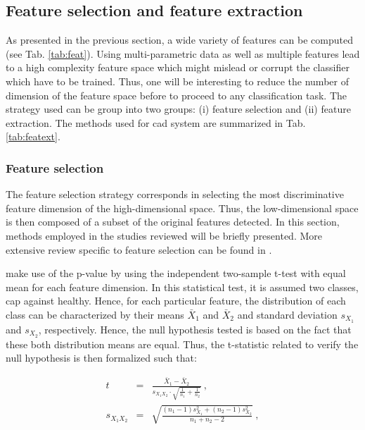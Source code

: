 \subsection{Feature selection and feature extraction} \label{subsec:featureselectionextraction}

As presented in the previous section, a wide variety of features can be computed (see Tab. \ref{tab:feat}). Using multi-parametric data as well as multiple features lead to a high complexity feature space which might mislead or corrupt the classifier which have to be trained. Thus, one will be interesting to reduce the number of dimension of the feature space before to proceed to any classification task. The strategy used can be group into two groups: (i) feature selection and (ii) feature extraction. The methods used for \ac{cad} system are summarized in Tab. \ref{tab:featext}.

\subsubsection{Feature selection}\label{subsubsec:featsel}

The feature selection strategy corresponds in selecting the most discriminative feature dimension of the high-dimensional space. Thus, the low-dimensional space is then composed of a subset of the original features detected. In this section, methods employed in the studies reviewed will be briefly presented. More extensive review specific to feature selection can be found in \cite{Saeys2007}.

\cite{Niaf2011,Niaf2012} make use of the p-value by using the independent two-sample t-test with equal mean for each feature dimension. In this statistical test, it is assumed two classes, \ac{cap} against healthy. Hence, for each particular feature, the distribution of each class can be characterized by their means $\bar{X}_1$ and $\bar{X}_2$ and standard deviation $s_{X_1}$ and $s_{X_2}$, respectively. Hence, the null hypothesis tested is based on the fact that these both distribution means are equal. Thus, the t-statistic related to verify the null hypothesis is then formalized such that:

\begin{eqnarray}
t & = & \frac{\bar {X}_1 - \bar{X}_2}{s_{X_1X_2} \cdot \sqrt{\frac{1}{n_1}+\frac{1}{n_2}}} \ , \label{eq:tstat} \\
s_{X_1X_2} & = & \sqrt{\frac{(n_1-1)s_{X_1}^2+(n_2-1)s_{X_2}^2}{n_1+n_2-2}} \ , \nonumber
\end{eqnarray}


